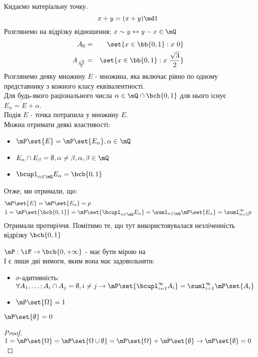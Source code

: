 \begin{exs}
Кидаємо матеріальну точку.
\begin{equation}
x+y = (x+y)\md 1
\end{equation}
Розглянемо на відрізку відношення: $x\sim y \leftrightarrow y-x\in\mQ$
\begin{eqnarray*}
A_0 &=& \set{x\in\bb{0,1}:x~0}\\
A_{\frac{\sqrt3}2} &=& \set{x\in\bb{0,1}:x~\frac{\sqrt3}2}
\end{eqnarray*}
Розглянемо деяку множину $E$ - множина, яка включає рівно по одному представнику з кожного класу еквівалентності. \\
Для будь-якого раціонального числа $\alpha\in\mQ\cap\bcb{0,1}$ для нього існує $E_\alpha = E+\alpha$.\\
Подія $E$ - точка потрапила у множину $E$.\\
Можна отримати деякі властивості:
\begin{itemize}
\item $\mP\set{E} = \mP\set{E_\alpha},\alpha\in\mQ$\\
\item $E_\alpha\cap E_\beta = \emptyset,\alpha\neq\beta,\alpha,\beta\in\mQ$\\
\item $\bcupl_{\alpha\in\mQ} E_\alpha=\bcb{0,1}$
\end{itemize}
Отже, ми отримали, що:
\begin{eqnarray}
&\mP\set{E} = \mP\set{E_\alpha}=p\\
&1=\mP\set{\bcb{0,1}}=\mP\set{\bcupl_{\alpha\in\mQ}E_\alpha}=\suml_{\alpha\in\mQ}\mP\set{E_\alpha}=\suml_{n=1}^\infty p
\end{eqnarray}
Отримали протиріччя. Помітимо те, що тут використовувалася незліченність відрізку $\bcb{0,1}$
\end{exs}
$\mP:\iF\to\bcb{0,+\infty}$ - має бути мірою на \iF\\
І є лише дві вимоги, яким вона має задовольняти:
\begin{itemize}
\item $\sigma$-адитивність: $\forall A_1,\ldots; A_i\cap A_j=\emptyset,i\neq j \rightarrow \mP\set{\bcupl_{i=1}^\infty A_i} = \suml_{i=1}^\infty \mP\set{A_i}$
\item $\mP\set{\Omega} = 1$
\end{itemize}
\begin{nasl}
$\mP\set{\emptyset}=0$
\end{nasl}
\begin{proof}
$1=\mP\set{\Omega}=\mP\set{\Omega\cup\emptyset} = \mP\set{\Omega}+\mP\set{\emptyset} \rightarrow \mP\set{\emptyset}=0$
\end{proof}
